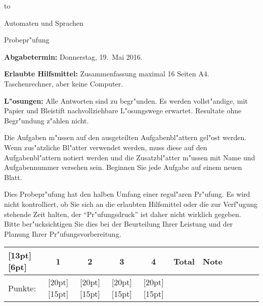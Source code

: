 %
%
%


\phantom{a}
\vspace{0.8cm}
{\parindent0pt\hbox to}
\vspace{1.5cm}

\begin{center}
{\LARGE Automaten und Sprachen}

\vspace{0.5cm}
{\Large Probepr"ufung}

\vspace{1.5cm}
\end{center}

{\parindent 0pt
{\bf Abgabetermin:}
Donnerstag, 19.~Mai 2016.
\smallskip

{\bf Erlaubte Hilfsmittel:} Zusammenfassung maximal 16 Seiten A4.
Taschenrechner, aber keine Computer.
\smallskip

{\bf L"osungen:} Alle Antworten sind zu begr"unden.
Es werden vollst"andige, mit Papier und Bleistift
nachvollziehbare L"o\-sungs\-wege erwartet. Resultate ohne Begr"undung
z"ahlen nicht.

Die Aufgaben m"ussen
auf den ausgeteilten Aufgabenbl"attern gel"ost werden. Wenn zus"atzliche
Bl"atter verwendet werden, muss diese auf den Aufgabenbl"attern notiert
werden und die Zusatzbl"atter m"ussen mit Name und Aufgabennummer versehen
sein. Beginnen Sie jede Aufgabe auf einem neuen Blatt.

Dies Probepr"ufung hat den halben Umfang einer regul"aren Pr"ufung.
Es wird nicht kontrolliert, ob Sie sich an die erlaubten Hilfsmittel
oder die zur Verf"ugung stehende Zeit halten, der ``Pr"ufungsdruck'' ist
daher nicht wirklich gegeben.
Bitte ber"ucksichtigen Sie dies bei der Beurteilung Ihrer Leistung
und der Planung Ihrer Pr"ufungsvorbereitung.
}

\vspace{1cm}

\begin{center}
\begin{tabular}{|l|c|c|c|c|c|c|c|c|c|c|}
\hline
\raisebox{0pt}[13pt][6pt]{\phantom{XX}}&1&2&3&4&Total&Note\\
\hline
Punkte:&
\raisebox{0pt}[20pt][15pt]{\phantom{XX}}&
\raisebox{0pt}[20pt][15pt]{\phantom{XX}}&
\raisebox{0pt}[20pt][15pt]{\phantom{XX}}&
\raisebox{0pt}[20pt][15pt]{\phantom{XX}}&\phantom{XXX}&\phantom{XXXX}\\
\hline
\end{tabular}
\end{center}


\pagebreak
\keineloesungen




